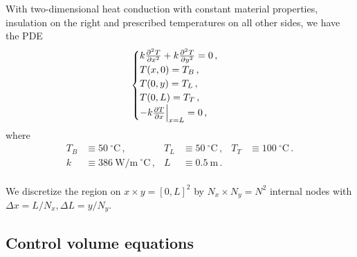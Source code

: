 \documentclass{article}
\begin{document}
With two-dimensional heat conduction with constant material properties, insulation on the right and prescribed temperatures on all other sides, we have the PDE
\begin{equation}
	\begin{cases}
		k \pdv{^2T}{x^2} + k \pdv{^2T}{y^2} = 0\,,\\
		T(x, 0) = T_B\,,\\
		T(0, y) = T_L\,,\\
		T(0, L) = T_T\,,\\
		-k \pdv{T}{x} \Big|_{x = L} = 0\,,
	\end{cases}
\end{equation}
where
\begin{align*}
	T_B & \equiv 50~^\circ\text{C}\,, & T_L & \equiv 50~^\circ\text{C}\,, & T_T & \equiv 100~^\circ\text{C}\,.\\
	k & \equiv 386~\text{W/m}~^\circ\text{C}\,, & L & \equiv 0.5~\text{m}\,.\\
\end{align*}

We discretize the region on $x \times y = [0, L]^2$ by $N_x \times N_y = N^2$ internal nodes with $\Delta x = L / N_x, \Delta L = y / N_y$.

\subsection*{Control volume equations}
\end{document}
